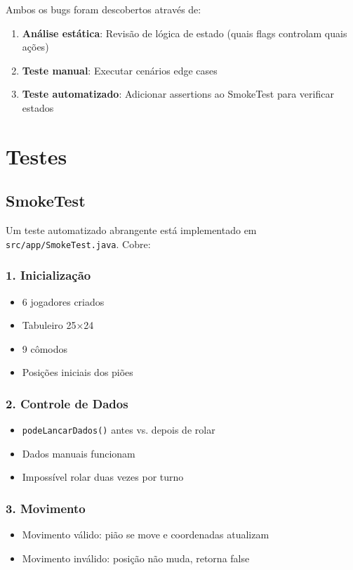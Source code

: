 \documentclass[12pt,a4paper]{report}
\begin{document}
Ambos os bugs foram descobertos através de:
\begin{enumerate}
    \item \textbf{Análise estática}: Revisão de lógica de estado (quais flags controlam quais ações)
    \item \textbf{Teste manual}: Executar cenários edge cases
    \item \textbf{Teste automatizado}: Adicionar assertions ao SmokeTest para verificar estados
\end{enumerate}

\chapter{Testes}

\section{SmokeTest}

Um teste automatizado abrangente está implementado em \texttt{src/app/SmokeTest.java}. Cobre:

\subsection{1. Inicialização}
\begin{itemize}
    \item 6 jogadores criados
    \item Tabuleiro 25×24
    \item 9 cômodos
    \item Posições iniciais dos piões
\end{itemize}

\subsection{2. Controle de Dados}
\begin{itemize}
    \item \texttt{podeLancarDados()} antes vs. depois de rolar
    \item Dados manuais funcionam
    \item Impossível rolar duas vezes por turno
\end{itemize}

\subsection{3. Movimento}
\begin{itemize}
    \item Movimento válido: pião se move e coordenadas atualizam
    \item Movimento inválido: posição não muda, retorna false
\end{itemize}
\end{document}
